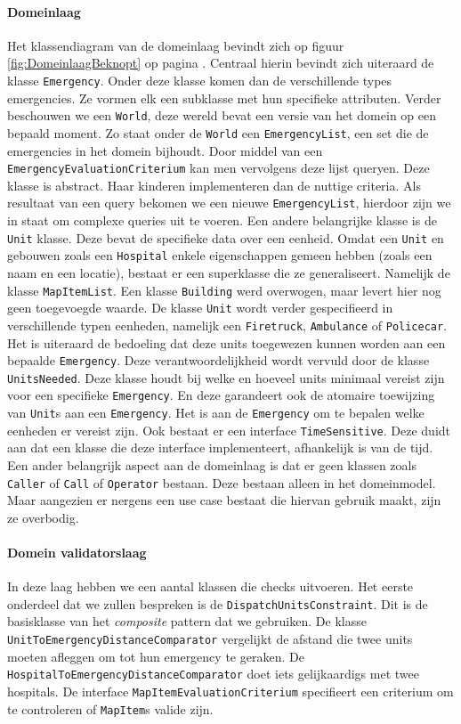\paragraph{Domeinlaag}
 Het klassendiagram van de domeinlaag bevindt zich op figuur \ref{fig:DomeinlaagBeknopt} op pagina \pageref{fig:DomeinlaagBeknopt}. Centraal hierin bevindt zich uiteraard de klasse \texttt{Emergency}. Onder deze klasse komen dan de verschillende types emergencies. Ze vormen elk een subklasse met hun specifieke attributen. Verder beschouwen we een \texttt{World}, deze wereld bevat een versie van het domein op een bepaald moment. Zo staat onder de \texttt{World} een \texttt{EmergencyList}, een set die de emergencies in het domein bijhoudt. Door middel van een \texttt{EmergencyEvaluationCriterium} kan men vervolgens deze lijst queryen. Deze klasse is abstract. Haar kinderen implementeren dan de nuttige criteria. Als resultaat van een query bekomen we een nieuwe \texttt{EmergencyList}, hierdoor zijn we in staat om complexe queries uit te voeren. Een andere belangrijke klasse is de \texttt{Unit} klasse. Deze bevat de specifieke data over een eenheid. Omdat een \texttt{Unit} en gebouwen zoals een \texttt{Hospital} enkele eigenschappen gemeen hebben (zoals een naam en een locatie), bestaat er een superklasse die ze generaliseert. Namelijk de klasse \texttt{MapItemList}. Een klasse \texttt{Building} werd overwogen, maar levert hier nog geen toegevoegde waarde. De klasse \texttt{Unit} wordt verder gespecifieerd in verschillende typen eenheden, namelijk een \texttt{Firetruck}, \texttt{Ambulance} of \texttt{Policecar}. Het is uiteraard de bedoeling dat deze units toegewezen kunnen worden aan een bepaalde \texttt{Emergency}. Deze verantwoordelijkheid wordt vervuld door de klasse \texttt{UnitsNeeded}. Deze klasse houdt bij welke en hoeveel units minimaal vereist zijn voor een specifieke \texttt{Emergency}. En deze garandeert ook de atomaire toewijzing van \texttt{Unit}s aan een \texttt{Emergency}. Het is aan de \texttt{Emergency} om te bepalen welke eenheden er vereist zijn. Ook bestaat er een interface \texttt{TimeSensitive}. Deze duidt aan dat een klasse die deze interface implementeert, afhankelijk is van de tijd. Een ander belangrijk aspect aan de domeinlaag is dat er geen klassen zoals \texttt{Caller} of \texttt{Call} of \texttt{Operator} bestaan. Deze bestaan alleen in het domeinmodel. Maar aangezien er nergens een use case bestaat die hiervan gebruik maakt, zijn ze overbodig.
\paragraph{Domein validatorslaag}
In deze laag hebben we een aantal klassen die checks uitvoeren. Het eerste onderdeel dat we zullen bespreken is de \texttt{DispatchUnitsConstraint}. Dit is de basisklasse van het \textit{composite} pattern dat we gebruiken. De klasse \texttt{UnitToEmergencyDistanceComparator} vergelijkt de afstand die twee units moeten afleggen om tot hun emergency te geraken. De \texttt{HospitalToEmergencyDistanceComparator} doet iets gelijkaardigs met twee hospitals. De interface \texttt{MapItemEvaluationCriterium} specifieert een criterium om te controleren of \texttt{MapItem}s valide zijn.
